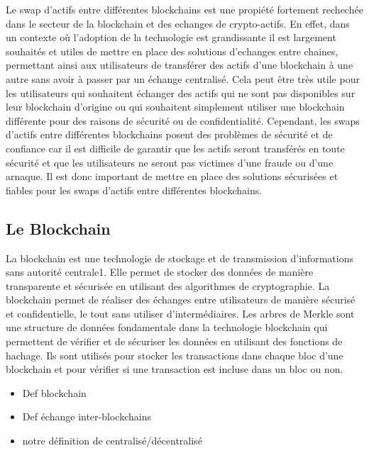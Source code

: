 Le swap d’actifs entre différentes blockchains est une propiété fortement rechechée dans le secteur de la
blockchain et des echanges de crypto-actifs. En effet, dans un contexte où l’adoption de la technologie est
grandissante \cite{evolutionCrypto2022} il est largement souhaités et utiles de mettre en place des solutions d’echanges entre chaines,
permettant ainsi aux utilisateurs de transférer des actifs d’une blockchain à une autre sans avoir à passer par
un échange centralisé. Cela peut être très utile pour les utilisateurs qui souhaitent échanger des actifs qui
ne sont pas disponibles sur leur blockchain d’origine ou qui souhaitent simplement utiliser une blockchain
différente pour des raisons de sécurité ou de confidentialité. Cependant, les swaps d’actifs entre différentes
blockchains posent des problèmes de sécurité et de confiance car il est difficile de garantir que les actifs seront
transférés en toute sécurité et que les utilisateurs ne seront pas victimes d’une fraude ou d’une arnaque. Il est
donc important de mettre en place des solutions sécurisées et fiables pour les swaps d’actifs entre différentes
blockchains.

\subsection{Le Blockchain}
La blockchain est une technologie de stockage et de transmission d’informations sans autorité centrale1. Elle 
permet de stocker des données de manière transparente et sécurisée en utilisant des algorithmes de cryptographie. 
La blockchain permet de réaliser des échanges entre utilisateurs de manière sécurisé et confidentielle, 
le tout sans utiliser d'intermédiaires. Les arbres de Merkle sont une structure de données fondamentale 
dans la technologie blockchain qui permettent de vérifier et de sécuriser les données en utilisant des 
fonctions de hachage. Ils sont utilisés pour stocker les transactions dans 
chaque bloc d’une blockchain et pour vérifier si une transaction est incluse dans un bloc ou non.

\begin{itemize}
    \item Def blockchain
    \item Def échange inter-blockchains
    \item notre définition de  centralisé/décentralisé
\end{itemize}
